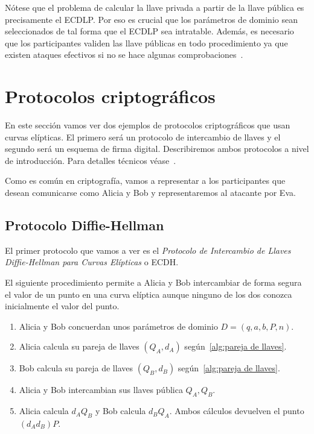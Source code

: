 Nótese que el problema de calcular la llave privada a partir de la llave pública es precisamente el ECDLP. Por eso es crucial que los parámetros de dominio sean seleccionados de tal forma que el ECDLP sea intratable. Además, es necesario que los participantes validen las llave públicas en todo procedimiento ya que existen ataques efectivos si no se hace algunas comprobaciones~\cite[cap. 4]{Hankerson:2003}.

\section{Protocolos criptográficos}
\label{sec:Protocolos criptográficos}

En este sección vamos ver dos ejemplos de protocolos criptográficos que usan curvas elípticas. El primero será un protocolo de intercambio de llaves y el segundo será un esquema de firma digital. Describiremos ambos protocolos a nivel de introducción. Para detalles técnicos véase~\cite[cap. 4]{Hankerson:2003}.

Como es común en criptografía, vamos a representar a los participantes que desean comunicarse como Alicia y Bob y representaremos al atacante por Eva.

\subsection{Protocolo Diffie-Hellman}
\label{sub:Protocolo Diffie-Hellman}

El primer protocolo que vamos a ver es el \emph{Protocolo de Intercambio de Llaves Diffie-Hellman para Curvas Elípticas} o ECDH.

\begin{protocolo}[ECDH]\label{pc:diffie-hellman}
    El siguiente procedimiento permite a Alicia y Bob intercambiar de forma segura el valor de un punto en una curva elíptica aunque ninguno de los dos conozca inicialmente el valor del punto.

    \begin{enumerate}
        \item Alicia y Bob concuerdan unos parámetros de dominio $D = (q, a, b, P, n)$.
        \item Alicia calcula su pareja de llaves $(Q_A, d_A)$ según~\ref{alg:pareja de llaves}.
        \item Bob calcula su pareja de llaves $(Q_B, d_B)$ según~\ref{alg:pareja de llaves}.
        \item Alicia y Bob intercambian sus llaves pública $Q_A, Q_B$.
        \item Alicia calcula $d_A Q_B$ y Bob calcula $d_B Q_A$. Ambos cálculos devuelven el punto $(d_A d_B) P$.
    \end{enumerate}
\end{protocolo}

